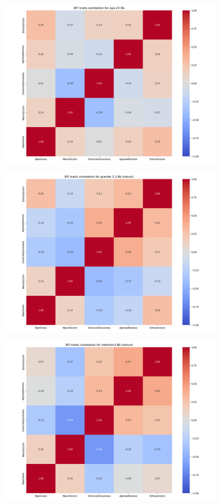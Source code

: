 \documentclass{article}
\begin{document}
\begin{figure}[H]
    \centering
    \includegraphics[width=0.7 \linewidth]{../Prompt_code/plots/aya-23-8b/bfi_correlation.png}
\end{figure}

\begin{figure}[H]
    \centering
    \includegraphics[width=0.7 \linewidth]{../Prompt_code/plots/granite-3.3-8b-instruct/bfi_correlation.png}
\end{figure}

\begin{figure}[H]
    \centering
    \includegraphics[width=0.7 \linewidth]{../Prompt_code/plots/internlm3-8b-instruct/bfi_correlation.png}
\end{figure}
\end{document}
